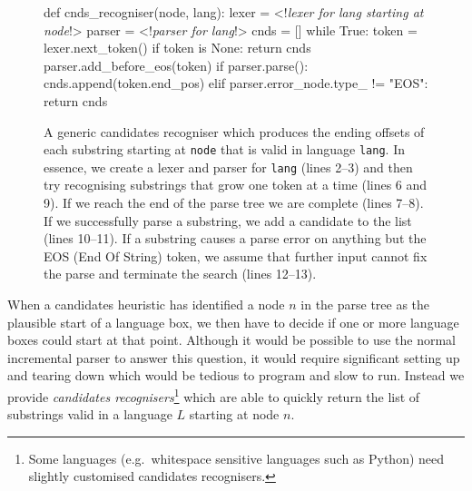 \documentclass[sigplan,screen]{acmart}\settopmatter{printfolios=true,printccs=false,printacmref=false}
\begin{document}
\begin{figure}
\begin{lstdefault}[]
def cnds_recogniser(node, lang):
  lexer = <!\textrm{\textit{lexer for lang starting at node}}!>
  parser = <!\textrm{\textit{parser for lang}}!>
  cnds = []
  while True:
    token = lexer.next_token()
    if token is None:
      return cnds
    parser.add_before_eos(token)
    if parser.parse():
      cnds.append(token.end_pos)
    elif parser.error_node.type_ != "EOS":
        return cnds
\end{lstdefault}
\caption{A generic candidates recogniser which produces the ending offsets of
  each substring starting at \texttt{node} that is valid in language
  \texttt{lang}. In essence, we create a lexer and parser for \texttt{lang}
  (lines 2--3) and then try recognising substrings that grow one token at a
  time (lines 6 and 9). If we reach the end of the parse tree we are complete
  (lines 7--8). If we successfully parse a substring, we add a candidate to the
  list (lines 10--11). If a substring causes a parse error on anything but the
  EOS (End Of String) token, we assume that further input cannot fix the parse
    and terminate the search (lines 12--13).}
\label{fig:recogniser}
\end{figure}

When a candidates heuristic has identified a node $n$ in the parse tree as the
plausible start of a language box, we then have to decide if one or more
language boxes could start at that point. Although it would be possible to use
the normal incremental parser to answer this question, it would require
significant setting up and tearing down which would be tedious to program and
slow to run. Instead we provide \emph{candidates recognisers}\footnote{Some languages
  (e.g.~whitespace sensitive languages such as Python) need slightly customised
candidates recognisers.} which are able to quickly return the list of substrings valid in
a language $L$ starting at node $n$.
\end{document}
